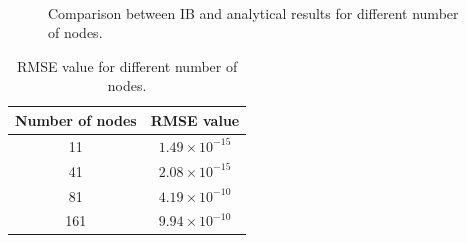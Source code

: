 \begin{figure}[H]
    \centering
    \quad
    \\
    \quad
    \caption{Comparison between IB and analytical results for different number of nodes.}
    \label{fig:C3_ghostCell_nodeNumber}
\end{figure}

\begin{table}[H]
\centering
\begin{tabular}{c | c}
     Number of nodes & RMSE value \\ \hline \hline
     11 & $1.49 \times 10^{-15}$ \\ \hline
     41 & $2.08 \times 10^{-15}$ \\ \hline
     81 & $4.19 \times 10^{-10}$ \\ \hline
     161 & $9.94 \times 10^{-10}$ \\
\end{tabular}
\caption{RMSE value for different number of nodes.}
\label{table:C3_ghostCell_nodeNumber_RMSE}
\end{table}

